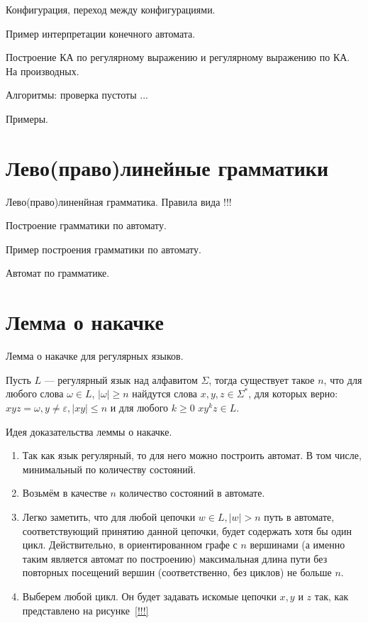 Конфигурация, переход между конфигурациями.

Пример интерпретации конечного автомата.

Построение КА по регулярному выражению и регулярному выражению по КА. На производных.

Алгоритмы: проверка пустоты ... 

Примеры.



\section{Лево(право)линейные грамматики}

\begin{definition}
    Лево(право)линенйная грамматика. Правила вида  !!!
\end{definition}

Построение грамматики по автомату.

Пример построения грамматики по автомату.

Автомат по грамматике. 

\section{Лемма о накачке}

Лемма о накачке для регулярных языков.

\begin{lemma}
    Пусть $L$ --- регулярный язык над алфавитом $\Sigma$, тогда существует такое $n$, что для любого слова $\omega \in L$, $|\omega| \geq n$ найдутся слова $x,y,z\in \Sigma^*$, для которых верно: $xyz = \omega, y\neq \varepsilon,|xy|\leq n$ и для любого $k \geq 0$  $xy^kz \in L$.
\end{lemma}

Идея доказательства леммы о накачке.

\begin{enumerate}
    \item Так как язык регулярный, то для него можно построить автомат. В том числе, минимальный по количеству состояний.
    \item Возьмём в качестве $n$ количество состояний в автомате.
    \item Легко заметить, что для любой цепочки $w \in L, |w| > n$ путь в автомате, соответствующий принятию данной цепочки, будет содержать хотя бы один цикл.
          Действительно, в ориентированном графе с $n$ вершинами (а именно таким является автомат по построению) максимальная длина пути без повторных посещений вершин (соответственно, без циклов) не больше $n$.
    \item Выберем любой цикл. Он будет задавать искомые цепочки $x, y$ и $z$ так, как представлено на рисунке~\ref{!!!} 
\end{enumerate}


